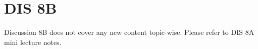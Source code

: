 \section{DIS 8B}
Discussion 8B does not cover any new content topic-wise. Please refer to DIS 8A mini lecture notes. 
